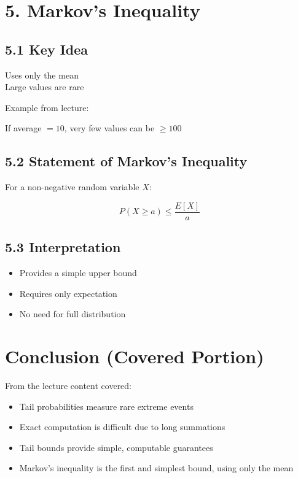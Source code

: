 \documentclass[12pt]{article}
\begin{document}
\section*{5. Markov’s Inequality}

\subsection*{5.1 Key Idea}

Uses only the mean \\
Large values are rare

Example from lecture:

If average $= 10$, very few values can be $\geq 100$

\subsection*{5.2 Statement of Markov’s Inequality}

For a non-negative random variable $X$:

\[
P(X \geq a) \leq \frac{E[X]}{a}
\]

\subsection*{5.3 Interpretation}

\begin{itemize}
\item Provides a simple upper bound
\item Requires only expectation
\item No need for full distribution
\end{itemize}

\section*{Conclusion (Covered Portion)}

From the lecture content covered:

\begin{itemize}
\item Tail probabilities measure rare extreme events
\item Exact computation is difficult due to long summations
\item Tail bounds provide simple, computable guarantees
\item Markov’s inequality is the first and simplest bound, using only the mean
\end{itemize}
\end{document}
